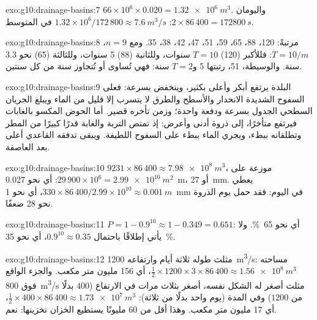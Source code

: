 \begin{solution}{exo:g10:drainage-basins:7}
$66 \times 10^6 \times 0.020 = \qty{1.32e6}{m^3}$. واليومان
$2 \times 86\,400 = \qty{172800}{s}$: $1.32 \times 10^6/172\,800 \approx
\qty{7.6}{m^3/s}$ في المتوسط.
\end{solution}

\begin{solution}{exo:g10:drainage-basins:8}
مرتبةً: 120، 88، 65، 59، 51، 47، 42، 38، 35. ومع $n = 9$، $T = 10/m$: فللأكبر
(120) $T = 10$ سنوات، وللثانية (88) 5 سنوات، وللثالثة (65)
نحو 3.3 سنة. والوسيطة، 51، رتبتها 5 و$T = 2$ سنة: فهي تُساوى
أو تُتجاوز سنة من كل سنتين.
\end{solution}

\begin{solution}{exo:g10:drainage-basins:9}
 البلدة يرتفع أبكر وأعلى بكثير، وينخفض بسرعة: فعلى السفوح الشديدة الانحدار
والأسطح والطرق لا يتسرب إلا قليل من الماء ويبلغ الجريان السطحي الجدول بسرعة ودفعة
واحدة؛ وزمن تأخره قصير. أما  الحوض المكسو بالغابات فيرتفع متأخرًا، إلى ذروة
أدنى وأعرض: إذ تمتص التربة والغابة قدرًا كبيرًا من المطر وتطلقانه ببطء، ويجري الماء
ببطء على السفوح اللطيفة. ويبقى تدفقه القاعدي أعلى بعد العاصفة.
\end{solution}

\begin{solution}{exo:g10:drainage-basins:10}
$9231 \times 86\,400 \approx \qty{7.98e8}{m^3}$، موزعة على
$29\,900 \times 10^6 = \qty{2.99e10}{m^2}$: أي نحو \qty{0.027}{m}، أو
\qty{27}{mm}.  يعطي $330 \times 86\,400/2.99 \times 10^{10}
\approx \qty{0.001}{m}$، أي نحو \qty{1}{mm} في اليوم: فقد حمل يوم الذروة نحو
28 ضعفًا.
\end{solution}

\begin{solution}{exo:g10:drainage-basins:11}
$P = 1 - 0.9^{10} \approx 1 - 0.349 = 0.651$: أي نحو \qty{65}{\percent}. ولا
يأتي إطلاقًا باحتمال $0.9^{10} \approx 0.35$، أي نحو
\qty{35}{\percent}.
\end{solution}

\begin{solution}{exo:g10:drainage-basins:12}
 مثلث طوله ثلاثة أيام وارتفاعه \qty{1200}{m^3/s}: مساحته
$\tfrac12 \times 1200 \times 3 \times 86\,400 \approx
\qty{1.56e8}{m^3}$، أي \num{156} مليون متر مكعب. والجزء الواقع فوق
\qty{800}{m^3/s} مثلث أصغر له الشكل نفسه، أصغر بثلاث مرات في الارتفاع
($400$ بدلًا من $1200$) وفي المدة (يوم واحد بدلًا من
ثلاثة): $\tfrac12 \times 400 \times 86\,400 \approx \qty{1.73e7}{m^3}$،
أي \num{17} مليون متر مكعب. وهذا أقل من \num{60} مليونًا يستطيع
الخزان تخزينها: نعم.
\end{solution}


